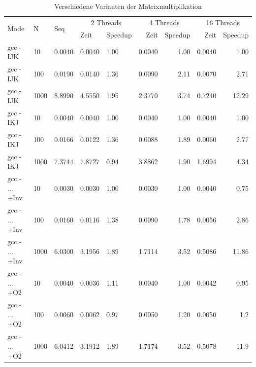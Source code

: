 \documentclass{report}
\begin{document}
			\begin{table}
			\begin{tabular}{|l|p{1cm}|p{1cm}|p{1cm}|p{1.5cm}|r|r|r|r|}
				\hline
			\multirow{2}{*}{Mode} & \multirow{2}{*}{N} & \multirow{2}{*}{Seq} & \multicolumn{2}{|c|}{2 Threads} & \multicolumn{2}{|c|}{4 Threads} & \multicolumn{2}{|c|}{16 Threads} \\
				& & & Zeit & Speedup & Zeit & Speedup & Zeit & Speedup \\
				\hline
				gcc - IJK & 10 & 		   0.0040  &     0.0040  &  1.00&      0.0040   & 1.00 &      0.0040  &  1.00\\
				
				gcc - IJK & 100 &           0.0190  &     0.0140  &  1.36&      0.0090   & 2.11&      0.0070  & 2.71\\
				
				gcc - IJK & 1000 &          8.8990  &     4.5550  &  1.95&        2.3770   & 3.74&       0.7240  & 12.29\\
				\hline
				gcc - IKJ  & 10 & 			0.0040  & 	 0.0040  & 1.00 & 	  0.0040  &  1.00&			0.0040 & 1.00\\
				
				gcc - IKJ & 100 &			0.0166  &     0.0122  &  1.36&		 0.0088  & 1.89&         0.0060  & 2.77\\
				
				gcc - IKJ & 1000 & 			7.3744  & 	 7.8727  & 0.94& 	  3.8862 & 1.90&         1.6994  & 4.34\\
				\hline
				gcc - ... +Inv & 10 &      0.0030  &     0.0030  & 1.00&       0.0030  & 1.00&        0.0040  & 0.75\\
				gcc - ... +Inv & 100 &	    0.0160  &     0.0116  & 1.38&       0.0090  & 1.78&			0.0056 & 2.86\\
				gcc - ... +Inv & 1000 & 	6.0300  &	3.1956  & 1.89&			1.7114 & 3.52&		0.5086 & 11.86\\
				\hline
				gcc - ... +O2 & 10 &  0.0040  &     0.0036  &  1.11&      0.0040   & 1.00&      0.0042  &  0.95\\
				 
				gcc - ... +O2 & 100 & 0.0060  &	  0.0062  &  0.97 &		0.0050  & 1.20 &        0.0050  &  1.2\\
				
				gcc - ... +O2 & 1000 & 6.0412  & 	3.1912 & 1.89 &       1.7174  & 3.52 &		  0.5078 & 11.9\\
				\hline
			\end{tabular}
			\caption{Verschiedene Varianten der Matrixmultiplikation}
			\label{Table:2b}
		\end{table}
\end{document}
